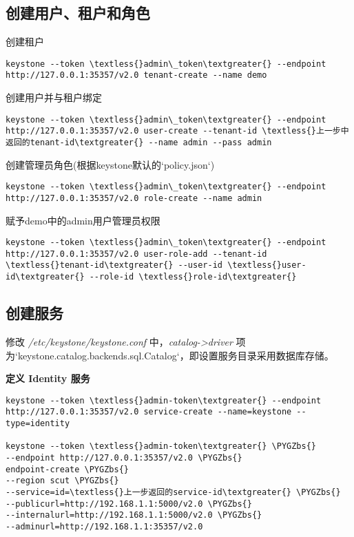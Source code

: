 \documentclass[a4paper,12pt,english]{sphinxmanual}
\def\PYGZbs{\char`\\}
\begin{document}
\subsection{创建用户、租户和角色}
\label{keystone:id6}
创建租户

\begin{Verbatim}[commandchars=\\\{\}]
keystone --token \textless{}admin\_token\textgreater{} --endpoint http://127.0.0.1:35357/v2.0 tenant-create --name demo
\end{Verbatim}

创建用户并与租户绑定

\begin{Verbatim}[commandchars=\\\{\}]
keystone --token \textless{}admin\_token\textgreater{} --endpoint http://127.0.0.1:35357/v2.0 user-create --tenant-id \textless{}上一步中返回的tenant-id\textgreater{} --name admin --pass admin
\end{Verbatim}

创建管理员角色(根据keystone默认的{}`policy.json{}`)

\begin{Verbatim}[commandchars=\\\{\}]
keystone --token \textless{}admin\_token\textgreater{} --endpoint http://127.0.0.1:35357/v2.0 role-create --name admin
\end{Verbatim}

赋予demo中的admin用户管理员权限

\begin{Verbatim}[commandchars=\\\{\}]
keystone --token \textless{}admin\_token\textgreater{} --endpoint http://127.0.0.1:35357/v2.0 user-role-add --tenant-id \textless{}tenant-id\textgreater{} --user-id \textless{}user-id\textgreater{} --role-id \textless{}role-id\textgreater{}
\end{Verbatim}


\subsection{创建服务}
\label{keystone:id7}
修改 \emph{/etc/keystone/keystone.conf} 中，\emph{catalog-\textgreater{}driver} 项为{}`keystone.catalog.backends.sql.Catalog{}`，即设置服务目录采用数据库存储。

\textbf{定义 Identity 服务}

\begin{Verbatim}[commandchars=\\\{\}]
keystone --token \textless{}admin-token\textgreater{} --endpoint http://127.0.0.1:35357/v2.0 service-create --name=keystone --type=identity

keystone --token \textless{}admin-token\textgreater{} \PYGZbs{}
--endpoint http://127.0.0.1:35357/v2.0 \PYGZbs{}
endpoint-create \PYGZbs{}
--region scut \PYGZbs{}
--service=id=\textless{}上一步返回的service-id\textgreater{} \PYGZbs{}
--publicurl=http://192.168.1.1:5000/v2.0 \PYGZbs{}
--internalurl=http://192.168.1.1:5000/v2.0 \PYGZbs{}
--adminurl=http://192.168.1.1:35357/v2.0
\end{Verbatim}
\end{document}
